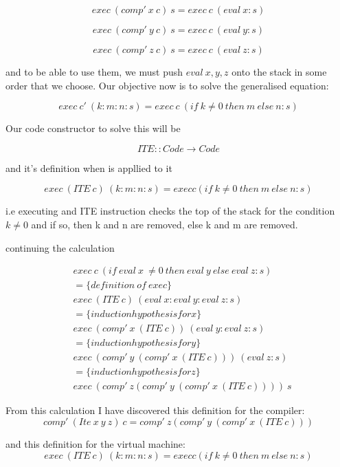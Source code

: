 \documentclass {article}
\begin{document}
\[exec \ (comp' \ x \ c) \ s = exec \ c \ (eval \ x:s) \]

\[exec \ (comp' \ y \ c) \ s = exec \ c \ (eval \ y:s) \]

\[exec \ (comp' \ z \ c) \ s = exec \ c \ (eval \ z:s) \]

and to be able to use them,
we must push $eval \ x,y,z$ onto the stack
in some order that we choose.
Our objective now is to solve the generalised equation:

	\[ exec \ c' \ (k:m:n:s) = exec \ c \ (if \ k \not= 0 \ then \ m \ else \ n:s)\]

Our code constructor to solve this will be

\[ ITE :: Code \rightarrow Code \]

and it's definition when \exec is appllied to it

\[ exec \ (ITE \ c) \ (k:m:n:s) = exec c (if \ k \not= 0 \ then \ m \ else \ n:s) \]

i.e executing and ITE instruction
checks the top of the stack for the condition $k \not= 0$
and if so, then k and n are removed,
else k and m are removed.

continuing the calculation

\begin{align*}
	&exec \ c \ (if \ eval \ x \ \not= 0 \ then \ eval \ y \ else \ eval \ z :s) \\
	&= \{definition \ of \ exec\} \\
	&exec \ (ITE \ c) \ (eval \ x:eval \ y:eval \ z:s) \\
	&= \{induction hypothesis for x\} \\
	&exec \ (comp' \ x \ (ITE \ c)) \ (eval \ y:eval \ z:s) \\
	&= \{induction hypothesis for y\} \\
	&exec \ (comp' \ y \ (comp' \ x \ (ITE \ c))) \ (eval \ z:s) \\
	&= \{induction hypothesis for z\} \\
	&exec \ (comp' \ z (comp' \ y \ (comp' \ x \ (ITE \ c)))) \ s
\end{align*}

From this calculation 
I have discovered this definition
for the compiler: 
\[ comp' \ (Ite \ x \ y \ z) \ c =  comp' \ z (comp' \ y \ (comp' \ x \ (ITE \ c)))\]

and this definition 
for the virtual machine: 
\[ exec \ (ITE \ c) \ (k:m:n:s) = exec c (if \ k \not= 0 \ then \ m \ else \ n:s) \]

%
%






%
%





\end{document}
